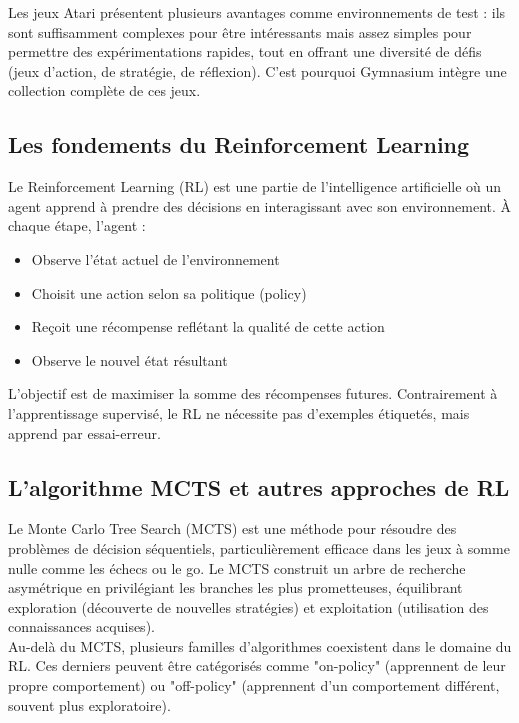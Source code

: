 \documentclass{article}
\begin{document}
Les jeux Atari présentent plusieurs avantages comme environnements de test : ils sont suffisamment complexes pour être intéressants mais assez simples pour permettre des expérimentations rapides, tout en offrant une diversité de défis (jeux d'action, de stratégie, de réflexion). C'est pourquoi Gymnasium intègre une collection complète de ces jeux.

\subsection{Les fondements du Reinforcement Learning}

\quad Le Reinforcement Learning (RL) est une partie de l’intelligence artificielle où un agent apprend à prendre des décisions en interagissant avec son environnement. À chaque étape, l'agent : 
\begin{itemize} 
    \item Observe l'état actuel de l'environnement
    \item Choisit une action selon sa politique (policy)
    \item Reçoit une récompense reflétant la qualité de cette action
    \item Observe le nouvel état résultant
\end{itemize}

\quad L'objectif est de maximiser la somme des récompenses futures. Contrairement à l'apprentissage supervisé, le RL ne nécessite pas d'exemples étiquetés, mais apprend par essai-erreur.

\subsection{L'algorithme MCTS et autres approches de RL}

\quad Le Monte Carlo Tree Search (MCTS) est une méthode pour résoudre des problèmes de décision séquentiels, particulièrement efficace dans les jeux à somme nulle comme les échecs ou le go. Le MCTS construit un arbre de recherche asymétrique en privilégiant les branches les plus prometteuses, équilibrant exploration (découverte de nouvelles stratégies) et exploitation (utilisation des connaissances acquises).\\

Au-delà du MCTS, plusieurs familles d'algorithmes coexistent dans le domaine du RL. Ces derniers peuvent être catégorisés  comme "on-policy" (apprennent de leur propre comportement) ou "off-policy" (apprennent d'un comportement différent, souvent plus exploratoire).\\
\end{document}
